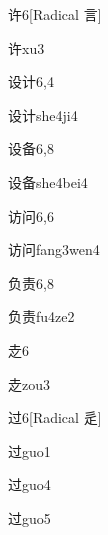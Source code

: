 \begin{entry}{许}{6}[Radical 言]
  \begin{phonetics}{许}{xu3}
  \end{phonetics}
\end{entry}

\begin{entry}{设计}{6,4}
  \begin{phonetics}{设计}{she4ji4}
  \end{phonetics}
\end{entry}

\begin{entry}{设备}{6,8}
  \begin{phonetics}{设备}{she4bei4}
  \end{phonetics}
\end{entry}

\begin{entry}{访问}{6,6}
  \begin{phonetics}{访问}{fang3wen4}
  \end{phonetics}
\end{entry}

\begin{entry}{负责}{6,8}
  \begin{phonetics}{负责}{fu4ze2}
  \end{phonetics}
\end{entry}

\begin{entry}{赱}{6}
  \begin{phonetics}{赱}{zou3}
  \end{phonetics}
\end{entry}

\begin{entry}{过}{6}[Radical 辵]
  \begin{phonetics}{过}{guo1}
  \end{phonetics}
  \begin{phonetics}{过}{guo4}
  \end{phonetics}
  \begin{phonetics}{过}{guo5}
  \end{phonetics}
\end{entry}

